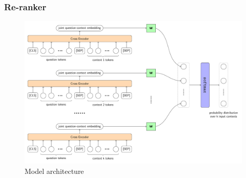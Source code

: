 \documentclass[11pt]{beamer}
\renewcommand{\raggedright}{\leftskip=0pt \rightskip=0pt plus 0cm}
\let\olditemize=\itemize
\renewenvironment{itemize}{\olditemize\raggedright}{\endlist}
\begin{document}
\begin{frame}
\frametitle{Re-ranker}
\vspace*{-20pt}
\begin{figure}[h]
	\includegraphics[scale=.43]{images/PDF/full-reranker/fullRerank.pdf}
	\caption{Model architecture}
\end{figure}
\end{frame}
\end{document}
